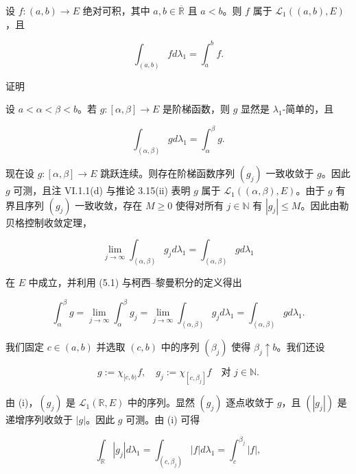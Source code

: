 \qyxffntextdef{1}{此处及类似情形中，我们把 $ \chi_{[c,b)}f $ 视为 $ \mathbb{R} $ 上的函数。写成 $ \chi_{[c,b)}\widetilde{f} $ 会更精确，但很繁琐。}
\begin{theorem}

设 $ f: (a,b) \to E $ 绝对可积，其中 $ a,b \in \overline{\mathbb{R}} $ 且 $ a < b $。则 $ f $ 属于 $ \mathcal{L}_{1}((a,b),E) $，且

\[
\int_{(a,b)} f d\lambda_{1} = \int_{a}^{b} f .
\]

证明

\begin{subitems}
\item

设 $ a < \alpha < \beta < b $。若 $ g: [\alpha,\beta] \to E $ 是阶梯函数，则 $ g $ 显然是 $ \lambda_{1} $-简单的，且

\begin{equation}
\int_{(\alpha,\beta)} g d\lambda_{1} = \int_{\alpha}^{\beta} g .\tag{5.1}
\end{equation}

现在设 $ g: [\alpha,\beta] \to E $ 跳跃连续。则存在阶梯函数序列 $ (g_{j}) $ 一致收敛于 $ g $。因此 $ g $ 可测，且注 VI.1.1(d) 与推论 3.15(ii) 表明 $ g $ 属于 $ \mathcal{L}_{1}((\alpha,\beta),E) $。由于 $ g $ 有界且序列 $ (g_{j}) $ 一致收敛，存在 $ M \ge 0 $ 使得对所有 $ j \in \mathbb{N} $ 有 $ |g_{j}| \le M $。因此由勒贝格控制收敛定理，

\[
\lim_{j \to \infty} \int_{(\alpha,\beta)} g_{j} d\lambda_{1} = \int_{(\alpha,\beta)} g d\lambda_{1}
\]

在 $ E $ 中成立，并利用 (5.1) 与柯西–黎曼积分的定义得出

\[
\int_{\alpha}^{\beta} g = \lim_{j \to \infty} \int_{\alpha}^{\beta} g_{j} = \lim_{j \to \infty} \int_{(\alpha,\beta)} g_{j} d\lambda_{1} = \int_{(\alpha,\beta)} g d\lambda_{1} .
\]
\item

我们固定 $ c \in (a,b) $ 并选取 $ (c,b) $ 中的序列 $ (\beta_{j}) $ 使得 $ \beta_{j} \uparrow b $。我们还设

\[
g := \chi_{[c,b)}f , \quad g_{j} := \chi_{[c,\beta_{j}]}f \quad \text{对 } j \in \mathbb{N} .
\]

由 (i)，$ (g_{j}) $ 是 $ \mathcal{L}_{1}(\mathbb{R},E) $ 中的序列。显然 $ (g_{j}) $ 逐点收敛于 $ g $，且 $ (|g_{j}|) $ 是递增序列收敛于 $ |g| $。因此 $ g $ 可测。由 (i) 可得

\[
\int_{\mathbb{R}} |g_{j}| d\lambda_{1} = \int_{(c,\beta_{j})} |f| d\lambda_{1} = \int_{c}^{\beta_{j}} |f| ,
\]


\end{subitems}
\end{theorem}
